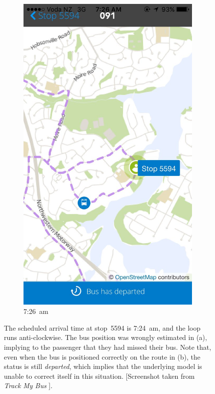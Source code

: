 \documentclass[12pt,a4paper]{article}
\begin{document}
\begin{figure}[!b]
\begin{subfigure}{0.4\textwidth}
    \includegraphics[width=\textwidth,trim={0 0 0 15cm},clip]{bus-loop-durp2.jpg}
    \caption{7:26~am}
    \label{fig:colwill-loop-2}
  \end{subfigure}
  \caption{%
    The scheduled arrival time at stop~5594 is 7:24~am, 
    and the loop runs anti-clockwise.
    The bus position was wrongly estimated in (a), 
    implying to the passenger that they had missed their bus. 
    Note that, even when the bus is positioned correctly on the route in (b), 
    the status is still \emph{departed}, 
    which implies that the underlying model is unable to correct itself in this situation.\newline
    \footnotesize{[Screenshot taken from \emph{Track My Bus} \citep{trackmybus}].}}
  \label{fig:colwill-loop}
\end{figure}
\end{document}

